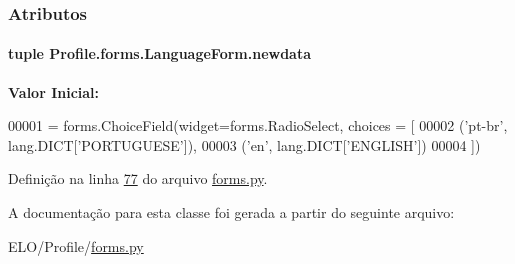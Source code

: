 \subsubsection{Atributos}
\hypertarget{classProfile_1_1forms_1_1LanguageForm_a327d764765fba9b8d9d82c86ca7e08a6}{}
\paragraph[{newdata}]{\setlength{\rightskip}{0pt plus 5cm}tuple Profile.\+forms.\+Language\+Form.\+newdata\hspace{0.3cm}{\ttfamily [static]}}\label{classProfile_1_1forms_1_1LanguageForm_a327d764765fba9b8d9d82c86ca7e08a6}
{\bfseries Valor Inicial\+:}
\begin{DoxyCode}
00001 = forms.ChoiceField(widget=forms.RadioSelect, choices = [
00002                                             (\textcolor{stringliteral}{'pt-br'}, lang.DICT[\textcolor{stringliteral}{'PORTUGUESE'}]),
00003                                             (\textcolor{stringliteral}{'en'}, lang.DICT[\textcolor{stringliteral}{'ENGLISH'}])
00004                                                 ])
\end{DoxyCode}


Definição na linha \hyperlink{Profile_2forms_8py_source_l00077}{77} do arquivo \hyperlink{Profile_2forms_8py_source}{forms.\+py}.



A documentação para esta classe foi gerada a partir do seguinte arquivo\+:\begin{DoxyCompactItemize}
\item 
E\+L\+O/\+Profile/\hyperlink{Profile_2forms_8py}{forms.\+py}\end{DoxyCompactItemize}
